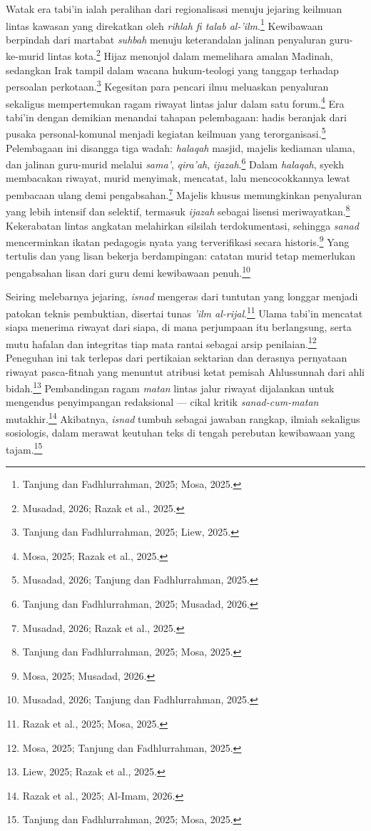 Watak era tabi'in ialah peralihan dari regionalisasi menuju jejaring keilmuan lintas kawasan yang direkatkan oleh \textit{rihlah fi talab al-'ilm}.\footnote{Tanjung dan Fadhlurrahman, 2025; Mosa, 2025.} Kewibawaan berpindah dari martabat \textit{suhbah} menuju keterandalan jalinan penyaluran guru-ke-murid lintas kota.\footnote{Musadad, 2026; Razak et al., 2025.} Hijaz menonjol dalam memelihara amalan Madinah, sedangkan Irak tampil dalam wacana hukum-teologi yang tanggap terhadap persoalan perkotaan.\footnote{Tanjung dan Fadhlurrahman, 2025; Liew, 2025.} Kegesitan para pencari ilmu meluaskan penyaluran sekaligus mempertemukan ragam riwayat lintas jalur dalam satu forum.\footnote{Mosa, 2025; Razak et al., 2025.} Era tabi'in dengan demikian menandai tahapan pelembagaan: hadis beranjak dari pusaka personal-komunal menjadi kegiatan keilmuan yang terorganisasi.\footnote{Musadad, 2026; Tanjung dan Fadhlurrahman, 2025.} Pelembagaan ini disangga tiga wadah: \textit{halaqah} masjid, majelis kediaman ulama, dan jalinan guru-murid melalui \textit{sama'}, \textit{qira'ah}, \textit{ijazah}.\footnote{Tanjung dan Fadhlurrahman, 2025; Musadad, 2026.} Dalam \textit{halaqah}, syekh membacakan riwayat, murid menyimak, mencatat, lalu mencocokkannya lewat pembacaan ulang demi pengabsahan.\footnote{Musadad, 2026; Razak et al., 2025.} Majelis khusus memungkinkan penyaluran yang lebih intensif dan selektif, termasuk \textit{ijazah} sebagai lisensi meriwayatkan.\footnote{Tanjung dan Fadhlurrahman, 2025; Mosa, 2025.} Kekerabatan lintas angkatan melahirkan silsilah terdokumentasi, sehingga \textit{sanad} mencerminkan ikatan pedagogis nyata yang terverifikasi secara historis.\footnote{Mosa, 2025; Musadad, 2026.} Yang tertulis dan yang lisan bekerja berdampingan: catatan murid tetap memerlukan pengabsahan lisan dari guru demi kewibawaan penuh.\footnote{Musadad, 2026; Tanjung dan Fadhlurrahman, 2025.}

Seiring melebarnya jejaring, \textit{isnad} mengeras dari tuntutan yang longgar menjadi patokan teknis pembuktian, disertai tunas \textit{'ilm al-rijal}.\footnote{Razak et al., 2025; Mosa, 2025.} Ulama tabi'in mencatat siapa menerima riwayat dari siapa, di mana perjumpaan itu berlangsung, serta mutu hafalan dan integritas tiap mata rantai sebagai arsip penilaian.\footnote{Mosa, 2025; Tanjung dan Fadhlurrahman, 2025.} Peneguhan ini tak terlepas dari pertikaian sektarian dan derasnya pernyataan riwayat pasca-fitnah yang menuntut atribusi ketat pemisah Ahlussunnah dari ahli bidah.\footnote{Liew, 2025; Razak et al., 2025.} Pembandingan ragam \textit{matan} lintas jalur riwayat dijalankan untuk mengendus penyimpangan redaksional --- cikal kritik \textit{sanad-cum-matan} mutakhir.\footnote{Razak et al., 2025; Al-Imam, 2026.} Akibatnya, \textit{isnad} tumbuh sebagai jawaban rangkap, ilmiah sekaligus sosiologis, dalam merawat keutuhan teks di tengah perebutan kewibawaan yang tajam.\footnote{Tanjung dan Fadhlurrahman, 2025; Mosa, 2025.}

